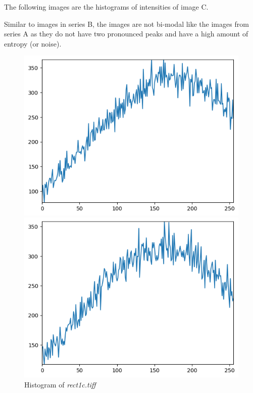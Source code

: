 \documentclass[runningheads]{llncs}
\begin{document}
\newpage
The following images are the histograms of intensities of image C. 
\par Similar to images in series B, the images are not bi-modal like the images from series A as they do not have two pronounced peaks and have a high amount of entropy (or noise).
\begin{figure}[h!]
\begin{minipage}[h]{0.47\linewidth}
\begin{center}
\includegraphics[width=1\linewidth]{Report/Result_Images/histogram_1c.png} 
\caption{Histogram of \emph{rect1c.tiff}}
\label{Histogram-1c}
\end{center} 
\end{minipage}
\hfill
\vspace{0.2 cm}
\begin{minipage}[h]{0.47\linewidth}
\begin{center}
\includegraphics[width=1\linewidth]{Report/Result_Images/histogram_2c.png} 

\end{center}
\end{minipage}
\end{figure}
\end{document}
